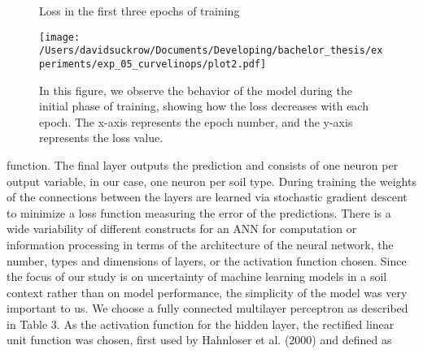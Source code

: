 \begin{figure}[h]
    \centering
    \caption{Loss in the first three epochs of training}  %
    \texttt{[image: /Users/davidsuckrow/Documents/Developing/bachelor\_thesis/experiments/exp\_05\_curvelinops/plot2.pdf]}  %
    \captionsetup{justification=justified}  %
    \hfill \caption*{In this figure, we observe the behavior of the model during the initial phase of training, showing how the loss decreases with each epoch. The x-axis represents the epoch number, and the y-axis represents the loss value.}  %
    \captionsetup{justification=centering}
    \label{fig:example}
\end{figure}




function. The final layer outputs the prediction and consists of one
neuron per output variable, in our case, one neuron per soil type. During
training the weights of the connections between the layers are learned
via stochastic gradient descent to minimize a loss function measuring
the error of the predictions. There is a wide variability of different
constructs for an ANN for computation or information processing in
terms of the architecture of the neural network, the number, types and
dimensions of layers, or the activation function chosen. Since the focus
of our study is on uncertainty of machine learning models in a soil
context rather than on model performance, the simplicity of the model
was very important to us. We choose a fully connected multilayer perceptron
as described in Table 3. As the activation function for the hidden
layer, the rectified linear unit function was chosen, first used by Hahnloser
et al. (2000) and defined as 


